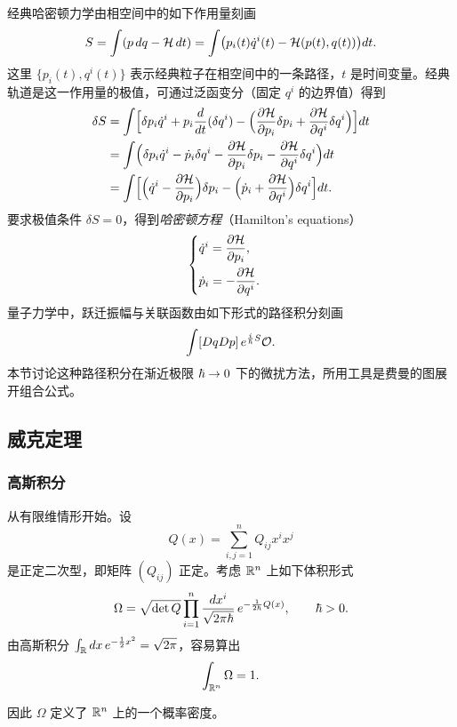经典哈密顿力学由相空间中的如下作用量刻画
\[
S=\int(p\,d q-\mathcal H\,d t)
=\int\bigl(p_i(t)\dot q^i(t)-\mathcal H(p(t),q(t))\bigr)d t.
\]
这里 $\{p_i(t),q^i(t)\}$ 表示经典粒子在相空间中的一条路径，$t$ 是时间变量。经典轨道是这一作用量的极值，可通过泛函变分（固定 $q^i$ 的边界值）得到
\begin{align*}
\delta S&=\int\Bigl[\delta p_i\dot q^i+p_i\frac{d}{d t}(\delta q^i)
-\Bigl(\frac{\partial\mathcal H}{\partial p_i}\delta p_i+\frac{\partial\mathcal H}{\partial q^i}\delta q^i\Bigr)\Bigr]d t\\
&=\int\Bigl(\delta p_i\dot q^i-\dot p_i\delta q^i
-\frac{\partial\mathcal H}{\partial p_i}\delta p_i-\frac{\partial\mathcal H}{\partial q^i}\delta q^i\Bigr)d t\\
&=\int\Bigl[\Bigl(\dot q^i-\frac{\partial\mathcal H}{\partial p_i}\Bigr)\delta p_i
-\Bigl(\dot p_i+\frac{\partial\mathcal H}{\partial q^i}\Bigr)\delta q^i\Bigr]d t.
\end{align*}
要求极值条件 $\delta S=0$，得到\emph{哈密顿方程}（Hamilton's equations）
\[
\begin{cases}
\dot q^i=\dfrac{\partial\mathcal H}{\partial p_i},\\[3mm]
\dot p_i=-\dfrac{\partial\mathcal H}{\partial q^i}.
\end{cases}
\]
量子力学中，跃迁振幅与关联函数由如下形式的路径积分刻画
\[
\int[DqDp]\,e^{\frac{i}{\hbar}S}\mathcal O.
\]
本节讨论这种路径积分在渐近极限 $\hbar\to0$ 下的微扰方法，所用工具是费曼的图展开组合公式。

\subsection{威克定理}

\subsubsection*{高斯积分}

从有限维情形开始。设
\[
Q(x)=\sum_{i,j=1}^n Q_{ij}x^ix^j
\]
是正定二次型，即矩阵 $(Q_{ij})$ 正定。考虑 $\mathbb{R}^n$ 上如下体积形式
\[
\Omega=\sqrt{\det Q}\prod_{i=1}^n\frac{d x^i}{\sqrt{2\pi\hbar}}\,
e^{-\frac{1}{2\hbar}Q(x)},\qquad \hbar>0.
\]
由高斯积分 $\int_{\mathbb{R}} d x\,e^{-\frac12x^2}=\sqrt{2\pi}$，容易算出
\[
\int_{\mathbb{R}^n}\Omega=1.
\]

因此 $\Omega$ 定义了 $\mathbb{R}^n$ 上的一个概率密度。

